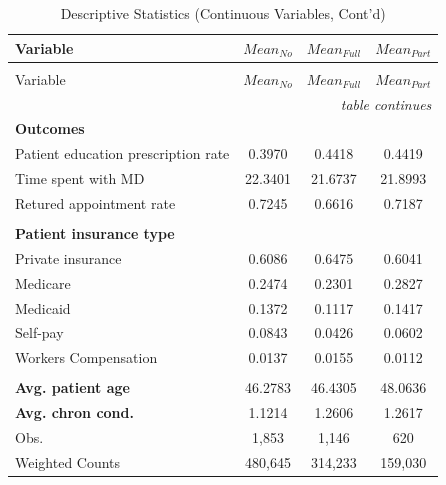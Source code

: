 \documentclass[12pt]{report}
\begin{document}
\newpage
{\footnotesize
\begin{center}
\label{tab:desc2}
\renewcommand*{\arraystretch}{0.6}
\begin{longtable}{lccc}
\caption{Descriptive Statistics (Continuous Variables)}\\

\hline \hline
Variable   & $Mean_{No}$ & $Mean_{Full}$ & $Mean_{Part}$ \\ \hline \endfirsthead

\caption*{Descriptive Statistics (Continuous Variables, Cont'd)}\\

\hline \hline
Variable   & $Mean_{No}$ & $Mean_{Full}$ & $Mean_{Part}$ \\ \hline \endhead

\hline  \multicolumn{4}{r}{\textit{table continues}}\\ \endfoot
\hline \hline  \endlastfoot

\textbf{Outcomes}                   &           &             &             \\
Patient education prescription rate & 0.3970    & 0.4418      & 0.4419      \\
Time spent with MD                  & 22.3401   & 21.6737     & 21.8993     \\
Retured appointment rate            & 0.7245    & 0.6616      & 0.7187      \\
                                    &           &             &             \\
\textbf{Patient insurance type}     &           &             &             \\
Private insurance                   & 0.6086    & 0.6475      & 0.6041      \\
Medicare                            & 0.2474    & 0.2301      & 0.2827      \\
Medicaid                            & 0.1372    & 0.1117      & 0.1417      \\
Self-pay                            & 0.0843    & 0.0426      & 0.0602      \\
Workers Compensation                & 0.0137    & 0.0155      & 0.0112      \\
                                    &           &             &             \\
\textbf{Avg. patient age}           & 46.2783   & 46.4305     & 48.0636     \\
\textbf{Avg. chron cond.}           & 1.1214    & 1.2606      & 1.2617      \\ 
Obs.                                & 1,853     & 1,146       & 620         \\
Weighted Counts                     & 480,645   & 314,233     & 159,030     \\
\end{longtable}
\end{center}}
\end{document}

